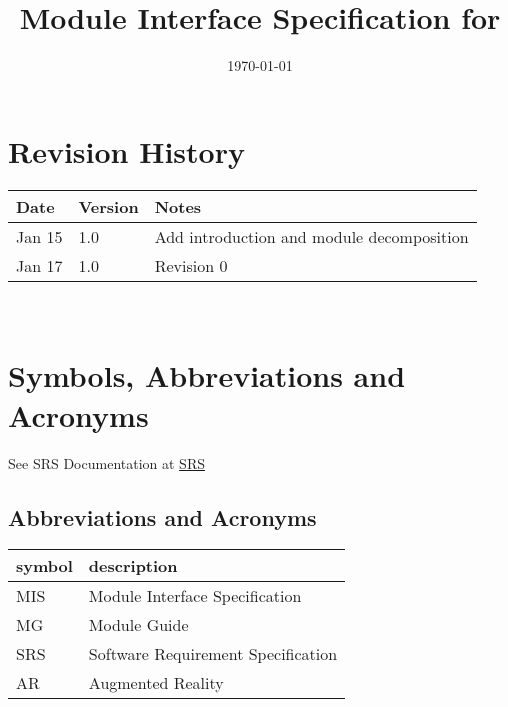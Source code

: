 \documentclass[12pt, titlepage]{article}
\begin{document}
\title{Module Interface Specification for \progname{}}

\author{\authname}

\date{\today}

\maketitle


\section{Revision History}

\begin{tabularx}{\textwidth}{p{3cm}p{2cm}X}
\toprule {\bf Date} & {\bf Version} & {\bf Notes}\\
\midrule
Jan 15 & 1.0 & Add introduction and module decomposition\\
Jan 17 & 1.0 & Revision 0\\
\bottomrule
\end{tabularx}

~\newpage

\section{Symbols, Abbreviations and Acronyms}

See SRS Documentation at \href{https://github.com/beatlepie/4G06CapstoneProjectTeam2/blob/main/docs/SRS-Volere/SRS.pdf}{SRS}
\subsection{Abbreviations and Acronyms}

\renewcommand{\arraystretch}{1.2}
\begin{tabular}{l l} 
  \toprule		
  \textbf{symbol} & \textbf{description}\\
  \midrule 
  MIS & Module Interface Specification \\
  MG & Module Guide \\
  SRS & Software Requirement Specification\\
  AR & Augmented Reality\\
  \bottomrule
\end{tabular}\\

\newpage

\tableofcontents

\newpage
\end{document}
